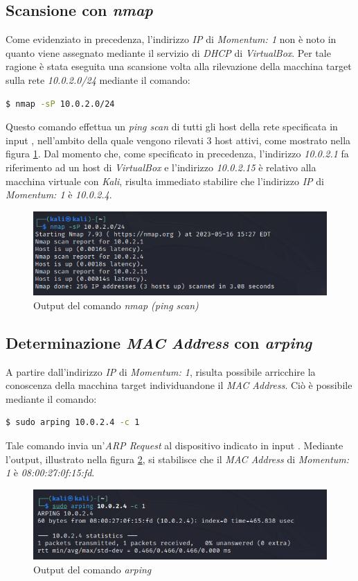 \subsection{Scansione con \emph{nmap}}
Come evidenziato in precedenza, l'indirizzo \emph{IP} di \emph{Momentum: 1} non è noto in quanto viene assegnato mediante il servizio di \emph{DHCP} di \emph{VirtualBox}. Per tale ragione è stata eseguita una scansione volta alla rilevazione della macchina target sulla rete \emph{10.0.2.0/24} mediante il comando:
\begin{lstlisting}[language=bash]
    $ nmap -sP 10.0.2.0/24
\end{lstlisting}
Questo comando effettua un \emph{ping scan} di tutti gli host della rete specificata in input \cite{nmap}, nell'ambito della quale vengono rilevati 3 host attivi, come mostrato nella figura \ref{fig:nmap}. Dal momento che, come specificato in precedenza, l'indirizzo \emph{10.0.2.1} fa riferimento ad un host di \emph{VirtualBox} e l'indirizzo \emph{10.0.2.15} è relativo alla macchina virtuale con \emph{Kali}, risulta immediato stabilire che l'indirizzo \emph{IP} di \emph{Momentum: 1} è \emph{10.0.2.4}.
\begin{figure}[h]
    \centering
    \includegraphics[scale=0.75]{capitoli/images/nmap.png}
    \caption{Output del comando \emph{nmap (ping scan)}}
    \label{fig:nmap}
\end{figure}
\subsection{Determinazione \emph{MAC Address} con \emph{arping}}
A partire dall'indirizzo \emph{IP} di \emph{Momentum: 1}, risulta possibile arricchire la conoscenza della macchina target individuandone il \emph{MAC Address}. Ciò è possibile mediante il comando:
\begin{lstlisting}[language=bash]
    $ sudo arping 10.0.2.4 -c 1
\end{lstlisting}
Tale comando invia un'\emph{ARP Request} al dispositivo indicato in input \cite{arping}. Mediante l'output, illustrato nella figura \ref{fig:arping}, si stabilisce che il \emph{MAC Address} di \emph{Momentum: 1} è \emph{08:00:27:0f:15:fd}.
\begin{figure}[h]
    \centering
    \includegraphics[scale=0.75]{capitoli/images/arping.png}
    \caption{Output del comando \emph{arping}}
    \label{fig:arping}
\end{figure}
